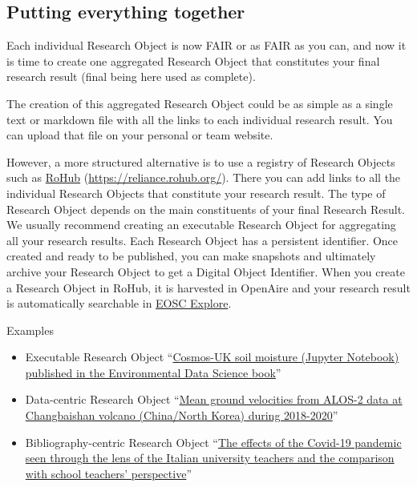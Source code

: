 \documentclass[
  letterpaper,
  DIV=11,
  numbers=noendperiod]{scrreport}
\providecommand{\tightlist}{%
  \setlength{\itemsep}{0pt}\setlength{\parskip}{0pt}}\usepackage{longtable,booktabs,array}
\begin{document}
\hypertarget{putting-everything-together}{%
\subsection{Putting everything
together}\label{putting-everything-together}}

Each individual Research Object is now FAIR or as FAIR as you can, and
now it is time to create one aggregated Research Object that constitutes
your final research result (final being here used as complete).

The creation of this aggregated Research Object could be as simple as a
single text or markdown file with all the links to each individual
research result. You can upload that file on your personal or team
website.

However, a more structured alternative is to use a registry of Research
Objects such as \href{https://reliance.rohub.org/}{RoHub}
(\url{https://reliance.rohub.org/}). There you can add links to all the
individual Research Objects that constitute your research result. The
type of Research Object depends on the main constituents of your final
Research Result. We usually recommend creating an executable Research
Object for aggregating all your research results. Each Research Object
has a persistent identifier. Once created and ready to be published, you
can make snapshots and ultimately archive your Research Object to get a
Digital Object Identifier. When you create a Research Object in RoHub,
it is harvested in OpenAire and your research result is automatically
searchable in \href{https://explore.eosc-portal.eu/}{EOSC Explore}.

Examples

\begin{itemize}
\tightlist
\item
  Executable Research Object
  ``\href{https://w3id.org/ro-id/435f534c-e49b-43c3-9bd6-3393100bef3f}{Cosmos-UK
  soil moisture (Jupyter Notebook) published in the Environmental Data
  Science book}''
\item
  Data-centric Research Object
  ``\href{https://w3id.org/ro-id/61bceafe-5b48-4548-8caf-4142153b1b1b}{Mean
  ground velocities from ALOS-2 data at Changbaishan volcano
  (China/North Korea) during 2018-2020}''
\item
  Bibliography-centric Research Object
  ``\href{https://w3id.org/ro-id/e1d32110-086e-4de3-80b2-21dfe6ae068a}{The
  effects of the Covid-19 pandemic seen through the lens of the Italian
  university teachers and the comparison with school teachers'
  perspective}''
\end{itemize}
\end{document}
